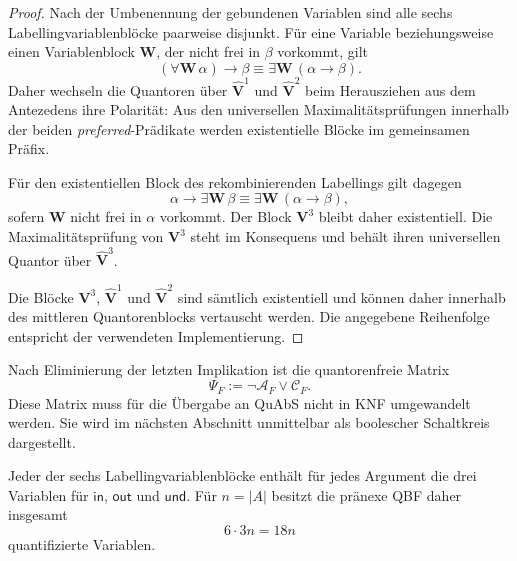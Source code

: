 \begin{proof}
Nach der Umbenennung der gebundenen Variablen sind alle sechs
Labellingvariablenblöcke paarweise disjunkt. Für eine Variable
beziehungsweise einen Variablenblock \(\mathbf W\), der nicht frei in
\(\beta\) vorkommt, gilt
\[
(\forall\mathbf W\,\alpha)\rightarrow\beta
\equiv
\exists\mathbf W\,(\alpha\rightarrow\beta).
\]
Daher wechseln die Quantoren über
\(\widehat{\mathbf V}^{1}\) und
\(\widehat{\mathbf V}^{2}\) beim Herausziehen aus dem Antezedens ihre
Polarität: Aus den universellen Maximalitätsprüfungen innerhalb der
beiden \emph{preferred}-Prädikate werden existentielle Blöcke im
gemeinsamen Präfix.

Für den existentiellen Block des rekombinierenden Labellings gilt
dagegen
\[
\alpha\rightarrow\exists\mathbf W\,\beta
\equiv
\exists\mathbf W\,(\alpha\rightarrow\beta),
\]
sofern \(\mathbf W\) nicht frei in \(\alpha\) vorkommt. Der Block
\(\mathbf V^3\) bleibt daher existentiell. Die Maximalitätsprüfung von
\(\mathbf V^3\) steht im Konsequens und behält ihren universellen
Quantor über \(\widehat{\mathbf V}^{3}\).

Die Blöcke \(\mathbf V^3\),
\(\widehat{\mathbf V}^{1}\) und
\(\widehat{\mathbf V}^{2}\) sind sämtlich existentiell und können daher
innerhalb des mittleren Quantorenblocks vertauscht werden. Die
angegebene Reihenfolge entspricht der verwendeten Implementierung.
\end{proof}

Nach Eliminierung der letzten Implikation ist die quantorenfreie Matrix
\[
\Psi_F
:=
\neg\mathcal A_F\lor\mathcal C_F.
\]
Diese Matrix muss für die Übergabe an QuAbS nicht in KNF umgewandelt
werden. Sie wird im nächsten Abschnitt unmittelbar als boolescher
Schaltkreis dargestellt.

Jeder der sechs Labellingvariablenblöcke enthält für jedes Argument die
drei Variablen für \(\mathsf{in}\), \(\mathsf{out}\) und
\(\mathsf{und}\). Für \(n=|A|\) besitzt die pränexe QBF daher insgesamt
\[
6\cdot 3n=18n
\]
quantifizierte Variablen.

